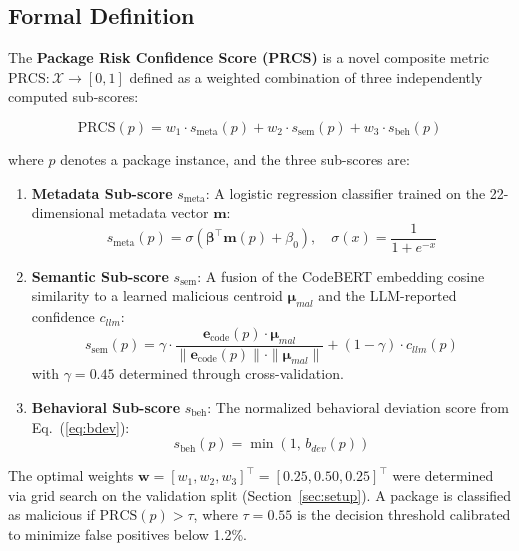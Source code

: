 \documentclass[conference]{IEEEtran}
\begin{document}
\subsection{Formal Definition}

The \textbf{Package Risk Confidence Score (PRCS)} is a novel composite metric $\text{PRCS}: \mathcal{X} \to [0,1]$ defined as a weighted combination of three independently computed sub-scores:

\begin{equation}
\text{PRCS}(p) = w_1 \cdot s_{\text{meta}}(p) + w_2 \cdot s_{\text{sem}}(p) + w_3 \cdot s_{\text{beh}}(p)
\label{eq:prcs}
\end{equation}

where $p$ denotes a package instance, and the three sub-scores are:

\begin{enumerate}
\item \textbf{Metadata Sub-score} $s_{\text{meta}}$: A logistic regression classifier trained on the 22-dimensional metadata vector $\mathbf{m}$:
\begin{equation}
s_{\text{meta}}(p) = \sigma\!\left(\boldsymbol{\beta}^\top \mathbf{m}(p) + \beta_0\right), \quad \sigma(x) = \frac{1}{1+e^{-x}}
\label{eq:smeta}
\end{equation}

\item \textbf{Semantic Sub-score} $s_{\text{sem}}$: A fusion of the CodeBERT embedding cosine similarity to a learned malicious centroid $\boldsymbol{\mu}_{mal}$ and the LLM-reported confidence $c_{llm}$:
\begin{equation}
s_{\text{sem}}(p) = \gamma \cdot \frac{\mathbf{e}_{\text{code}}(p) \cdot \boldsymbol{\mu}_{mal}}{\|\mathbf{e}_{\text{code}}(p)\| \cdot \|\boldsymbol{\mu}_{mal}\|} + (1-\gamma) \cdot c_{llm}(p)
\label{eq:ssem}
\end{equation}
with $\gamma = 0.45$ determined through cross-validation.

\item \textbf{Behavioral Sub-score} $s_{\text{beh}}$: The normalized behavioral deviation score from Eq.~(\ref{eq:bdev}):
\begin{equation}
s_{\text{beh}}(p) = \min(1,\, b_{dev}(p))
\label{eq:sbeh}
\end{equation}
\end{enumerate}

The optimal weights $\mathbf{w} = [w_1, w_2, w_3]^\top = [0.25, 0.50, 0.25]^\top$ were determined via grid search on the validation split (Section~\ref{sec:setup}). A package is classified as malicious if $\text{PRCS}(p) > \tau$, where $\tau = 0.55$ is the decision threshold calibrated to minimize false positives below 1.2\%.
\end{document}
